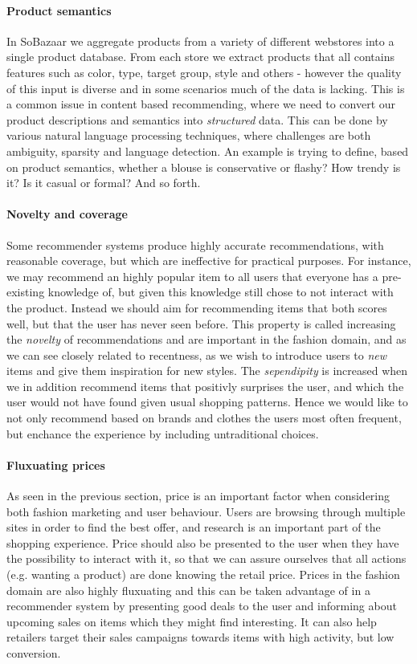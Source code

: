 \paragraph{Product semantics}
In SoBazaar we aggregate products from a variety of different webstores into a
single product database. From each store we extract products that all contains
features such as color, type, target group, style and others - however the
quality of this input is diverse and in some scenarios much of the data is
lacking. This is a common issue in content based recommending, where we need to
convert our product descriptions and semantics into \textit{structured} data.
This can be done by various natural language processing techniques, where
challenges are both ambiguity, sparsity and language detection. An example is
trying to define, based on product semantics, whether a blouse is conservative
or flashy? How trendy is it? Is it casual or formal? And so
forth.~\cite{ghani2002building}

\paragraph{Novelty and coverage}
Some recommender systems produce highly accurate recommendations, with
reasonable coverage, but which are ineffective for practical purposes. For
instance, we may recommend an highly popular item to all users that everyone
has a pre-existing knowledge of, but given this knowledge still chose to not
interact with the product. Instead we should aim for recommending items that
both scores well, but that the user has never seen before. This property is
called increasing the \textit{novelty} of recommendations and are important in
the fashion domain, and as we can see closely related to recentness, as we wish
to introduce users to \textit{new} items and give them inspiration for new
styles. The \textit{sependipity} is increased when we in addition recommend
items that positivly surprises the user, and which the user would not have
found given usual shopping patterns. Hence we would like to not only recommend
based on brands and clothes the users most often frequent, but enchance the
experience by including untraditional choices.

\paragraph{Fluxuating prices}
As seen in the previous section, price is an important factor when considering
both fashion marketing and user behaviour. Users are browsing through multiple
sites in order to find the best offer, and research is an important part of the
shopping experience. Price should also be presented to the user when they have
the possibility to interact with it, so that we can assure ourselves that all
actions (e.g. wanting a product) are done knowing the retail price. Prices in
the fashion domain are also highly fluxuating and this can be taken advantage
of in a recommender system by presenting good deals to the user and informing
about upcoming sales on items which they might find interesting. It can also
help retailers target their sales campaigns towards items with high activity,
but low conversion.

